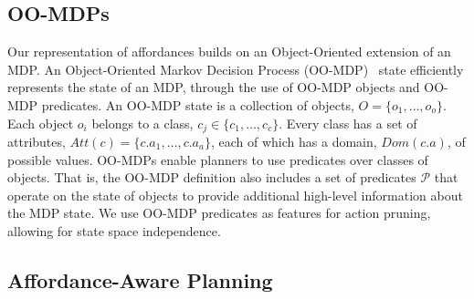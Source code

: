 \documentclass[conference]{IEEEtran}
\newcommand{\enote}[1]{\textcolor{Red}{\textbf{}}}
\begin{document}
\subsection{OO-MDPs}
Our representation of affordances builds on an Object-Oriented extension of an MDP.
An Object-Oriented Markov Decision Process (OO-MDP)~\citep{diuk08} state
efficiently represents the state of an MDP, through the use of OO-MDP objects
and OO-MDP predicates.  An OO-MDP state is a collection of
objects, $O = \{o_1, \ldots, o_o \}$.  Each object $o_i$ belongs to a
class, $c_j \in \{c_1, \ldots, c_c\}$. Every class has a set of
attributes, $Att(c) = \{c.a_1, \ldots, c.a_a \}$, each of which has a
domain, $Dom(c.a)$, of possible values. OO-MDPs
enable planners to use predicates over classes of objects. That is, the OO-MDP
definition also includes a set of predicates $\mathcal{P}$ that operate
on the state of objects to provide additional high-level information
about the MDP state. We use OO-MDP predicates as features for action
pruning, allowing for state space \enote{we're inconsistent about state-space vs state space and should pick one} independence.



\subsection{Affordance-Aware Planning}
\enote{This seems like a misnomer for this section since all this section really is is "we can get an action distribution to be later used in planning" and we haven't yet dug into how we actually are pruning/planning yet.}
\end{document}
